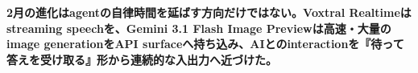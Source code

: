 \noindent\textbf{2月の進化はagentの自律時間を延ばす方向だけではない。Voxtral Realtimeはstreaming speechを、Gemini 3.1 Flash Image Previewは高速・大量のimage generationをAPI surfaceへ持ち込み、AIとのinteractionを『待って答えを受け取る』形から連続的な入出力へ近づけた。}\autocite{src-a24fd97eb3d0,src-d8b7c1c36830}

